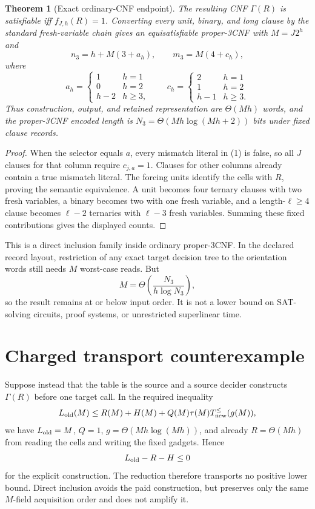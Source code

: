 \documentclass[11pt]{article}
\newtheorem{theorem}{Theorem}
\begin{document}
\begin{theorem}[Exact ordinary-CNF endpoint]
The resulting CNF $\Gamma(R)$ is satisfiable iff $f_{J,h}(R)=1$.  Converting
every unit, binary, and long clause by the standard fresh-variable chain
gives an equisatisfiable proper-3CNF with $M=J2^h$ and
\[
 n_3=h+M(3+a_h),\qquad m_3=M(4+c_h),
\]
where
\[
a_h=\begin{cases}1&h=1\\0&h=2\\h-2&h\ge3,
\end{cases}
\qquad
c_h=\begin{cases}2&h=1\\1&h=2\\h-1&h\ge3.
\end{cases}
\]
Thus construction, output, and retained representation are
$\Theta(Mh)$ words, and the proper-3CNF encoded length is
$N_3=\Theta(Mh\log(Mh+2))$ bits under fixed clause records.
\end{theorem}
\begin{proof}
When the selector equals $a$, every mismatch literal in (1) is false, so
all $J$ clauses for that column require $c_{j,a}=1$.  Clauses for other
columns already contain a true mismatch literal.  The forcing units identify
the cells with $R$, proving the semantic equivalence.  A unit becomes four
ternary clauses with two fresh variables, a binary becomes two with one
fresh variable, and a length-$\ell\ge4$ clause becomes $\ell-2$ ternaries
with $\ell-3$ fresh variables.  Summing these fixed contributions gives the
displayed counts.
\end{proof}

This is a direct inclusion family inside ordinary proper-3CNF.  In the
declared record layout, restriction of any exact target decision tree to the
orientation words still needs $M$ worst-case reads.  But
\[
M=\Theta\!\left(\frac{N_3}{h\log N_3}\right),
\]
so the result remains at or below input order.  It is not a lower bound on
SAT-solving circuits, proof systems, or unrestricted superlinear time.

\section{Charged transport counterexample}

Suppose instead that the table is the source and a source decider constructs
$\Gamma(R)$ before one target call.  In the required inequality
\[
L_{\rm old}(M)\le R(M)+H(M)+Q(M)\tau(M)T_{\rm new}^{\le}(g(M)),
\]
we have $L_{\rm old}=M$, $Q=1$, $g=\Theta(Mh\log(Mh))$, and already
$R=\Theta(Mh)$ from reading the cells and writing the fixed gadgets.  Hence
\[
L_{\rm old}-R-H\le0
\]
for the explicit construction.  The reduction therefore transports no
positive lower bound.  Direct inclusion avoids the paid construction, but
preserves only the same $M$-field acquisition order and does not amplify it.
\end{document}
